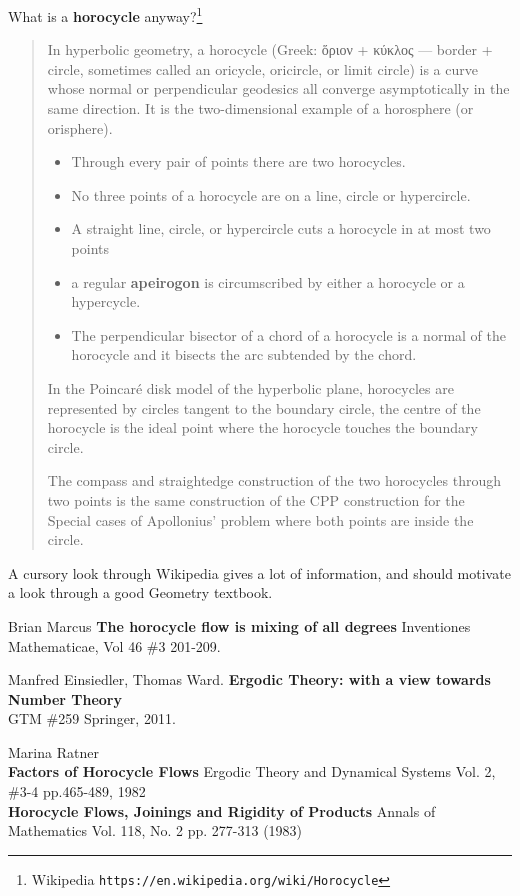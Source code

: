 \documentclass[12pt]{article}
\begin{document}
What is a \textbf{horocycle} anyway?\footnote{Wikipedia \texttt{https://en.wikipedia.org/wiki/Horocycle}} 
\begin{quotation} \noindent In hyperbolic geometry, a horocycle (Greek: ὅριον + κύκλος — border + circle, sometimes called an oricycle, oricircle, or limit circle) is a curve whose normal or perpendicular geodesics all converge asymptotically in the same direction. It is the two-dimensional example of a horosphere (or orisphere).
\begin{itemize}
\item Through every pair of points there are two horocycles.
\item No three points of a horocycle are on a line, circle or hypercircle.
\item A straight line, circle, or hypercircle cuts a horocycle in at most two points
\item a regular \textbf{apeirogon} is circumscribed by either a horocycle or a hypercycle.
\item The perpendicular bisector of a chord of a horocycle is a normal of the horocycle and it bisects the arc subtended by the chord.
\end{itemize}
In the Poincar\'{e} disk model of the hyperbolic plane, horocycles are represented by circles tangent to the boundary circle, the centre of the horocycle is the ideal point where the horocycle touches the boundary circle.

The compass and straightedge construction of the two horocycles through two points is the same construction of the CPP construction for the Special cases of Apollonius' problem where both points are inside the circle.
\end{quotation}
A cursory look through Wikipedia gives a lot of information, and should motivate a look through a good Geometry textbook.  

\vfill
\begin{thebibliography}{} 

\item Brian Marcus \textbf{The horocycle flow is mixing of all degrees} Inventiones Mathematicae, Vol 46 \#3 201-209.

\item Manfred Einsiedler, Thomas Ward. \textbf{Ergodic Theory: with a view towards Number Theory} \\GTM \#259 Springer, 2011.

\item Marina Ratner \\ 
\textbf{Factors of Horocycle Flows}  Ergodic Theory and Dynamical Systems  Vol. 2, \#3-4 pp.465-489, 1982 \\
\textbf{Horocycle Flows, Joinings and Rigidity of Products} Annals of Mathematics Vol. 118, No. 2 pp. 277-313 (1983)

\end{thebibliography}
\end{document}
